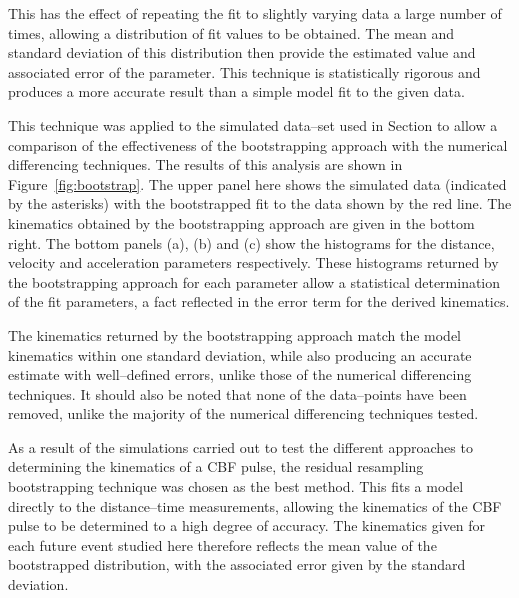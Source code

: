 \documentclass[structabstract]{aa}
\begin{document}
 This has the effect of repeating the fit to slightly varying data a large number of times, allowing a distribution of fit values to be obtained. The mean and standard deviation of this distribution then provide the estimated value and associated error of the parameter. This technique is statistically rigorous and produces a more accurate result than a simple model fit to the given data. 

This technique was applied to the simulated data--set used in Section to allow a comparison of the effectiveness of the bootstrapping approach with the numerical differencing techniques. The results of this analysis are shown in Figure~\ref{fig:bootstrap}. The upper panel here shows the simulated data (indicated by the asterisks) with the bootstrapped fit to the data shown by the red line. The kinematics obtained by the bootstrapping approach are given in the bottom right. The bottom panels (a), (b) and (c) show the histograms for the distance, velocity and acceleration parameters respectively. These histograms returned by the bootstrapping approach for each parameter allow a statistical determination of the fit parameters, a fact reflected in the error term for the derived kinematics. 

The kinematics returned by the bootstrapping approach match the model kinematics within one standard deviation, while also producing an accurate estimate with well--defined errors, unlike those of the numerical differencing techniques. It should also be noted that none of the data--points have been removed, unlike the majority of the numerical differencing techniques tested. 

As a result of the simulations carried out to test the different approaches to determining the kinematics of a CBF pulse, the residual resampling bootstrapping technique was chosen as the best method. This fits a model directly to the distance--time measurements, allowing the kinematics of the CBF pulse to be determined to a high degree of accuracy. The kinematics given for each future event studied here therefore reflects the mean value of the bootstrapped distribution, with the associated error given by the standard deviation.
\end{document}
